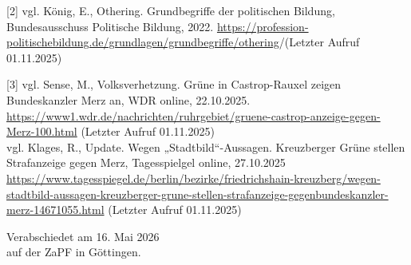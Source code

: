 \documentclass[DIV=calc]{scrartcl}
\begin{document}
[2] vgl. König, E., Othering. Grundbegriffe der politischen Bildung, Bundesausschuss Politische Bildung, 
2022. \url{https://profession-politischebildung.de/grundlagen/grundbegriffe/othering}/(Letzter Aufruf 
01.11.2025)

[3] vgl. Sense, M., Volksverhetzung. Grüne in Castrop-Rauxel zeigen Bundeskanzler Merz an, WDR online, 
22.10.2025. \url{https://www1.wdr.de/nachrichten/ruhrgebiet/gruene-castrop-anzeige-gegen-Merz-100.html}
(Letzter Aufruf 01.11.2025) \\vgl. Klages, R., Update. Wegen „Stadtbild“-Aussagen. Kreuzberger Grüne stellen 
Strafanzeige gegen Merz, Tagesspielgel online, 27.10.2025 \url{https://www.tagesspiegel.de/berlin/bezirke/friedrichshain-kreuzberg/wegen-stadtbild-aussagen-kreuzberger-grune-stellen-strafanzeige-gegenbundeskanzler-merz-14671055.html} (Letzter Aufruf 01.11.2025)


\vspace{1cm} 
%
\vfill
\begin{flushright}
	Verabschiedet am 16. Mai 2026 \\
	auf der ZaPF in Göttingen.
\end{flushright}
\end{document}
